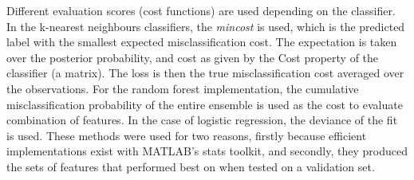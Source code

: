 Different evaluation scores (cost functions) are used depending on the classifier. In the k-nearest neighbours classifiers, the \textit{mincost} is used, which is the predicted label with the smallest expected misclassification cost. The expectation is taken over the posterior probability, and cost as given by the Cost property of the classifier (a matrix). The loss is then the true misclassification cost averaged over the observations. For the random forest implementation, the cumulative misclassification probability of the entire ensemble is used as the cost to evaluate combination of features. In the case of logistic regression, the deviance of the fit is used. These methods were used for two reasons, firstly because efficient implementations exist with MATLAB's stats toolkit, and secondly, they produced the sets of features that performed best on when tested on a validation set.